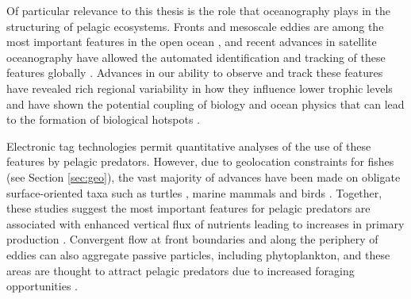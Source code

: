 Of particular relevance to this thesis is the role that oceanography plays in the structuring of pelagic ecosystems. Fronts and mesoscale eddies are among the most important features in the open ocean \citep{Chelton2011, McGillicuddy2016, Mahadevan2016}, and recent advances in satellite oceanography have allowed the automated identification and tracking of these features globally \citep{Chelton2011, Belkin2009}. Advances in our ability to observe and track these features have revealed rich regional variability in how they influence lower trophic levels \citep{McGillicuddy2016, Gaube2017DSR} and have shown the potential coupling of biology and ocean physics that can lead to the formation of biological hotspots \citep{Mann2006, Belkin2014}.


Electronic tag technologies permit quantitative analyses of the use of these features by pelagic predators. However, due to geolocation constraints for fishes (see Section \ref{sec:geo}), the vast majority of advances have been made on obligate surface-oriented taxa such as turtles \citep[\eg][]{Gaube2017, Polovina2006, Kobayashi2011}, marine mammals \citep[\eg][]{Johnston2007, Bailleul2010} and birds \citep[\eg][]{Thorne2013, TewKai2009}. Together, these studies suggest the most important features for pelagic predators are associated with enhanced vertical flux of nutrients leading to increases in primary production \citep{Franks1992}. Convergent flow at front boundaries and along the periphery of eddies can also aggregate passive particles, including phytoplankton, and these areas are thought to attract pelagic predators due to increased foraging opportunities \citep{Scales2014}.


